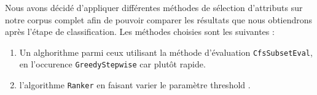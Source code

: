 Nous avons décidé d'appliquer différentes méthodes de sélection d'attributs sur notre corpus complet afin de pouvoir comparer les résultats que nous obtiendrons après l'étape de classification. Les méthodes choisies sont les suivantes : 

\begin{enumerate}
\item Un alghorithme parmi ceux utilisant la méthode d'évaluation \texttt{CfsSubsetEval}, en l'occurence \texttt{GreedyStepwise} car plutôt rapide.
\item l'algorithme \texttt{Ranker} en faisant varier le paramètre \og threshold \fg{}.
\end{enumerate}
